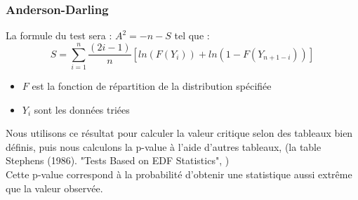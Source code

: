 \documentclass{report}
\begin{document}
\subsubsection{Anderson-Darling}
La formule du test sera : $A^2=-n-S$
tel que :
\begin{displaymath}
  S=\sum^n_{i=1}\frac{(2i-1)}{n}[ln(F(Y_i))+ln(1-F(Y_{n+1-i}))]
\end{displaymath}
\begin{itemize}
  \item $F$ est la fonction de répartition de la distribution spécifiée
  \item $Y_i$ sont les données triées
\end{itemize}
Nous utilisons ce résultat pour calculer la valeur critique
selon des tableaux bien définis, puis nous calculons la p-value
à l'aide d'autres tableaux,  (la table Stephens (1986). "Tests Based on EDF Statistics", )
\\Cette p-value correspond à la probabilité d'obtenir une statistique aussi
extrême que la valeur observée.
\end{document}
